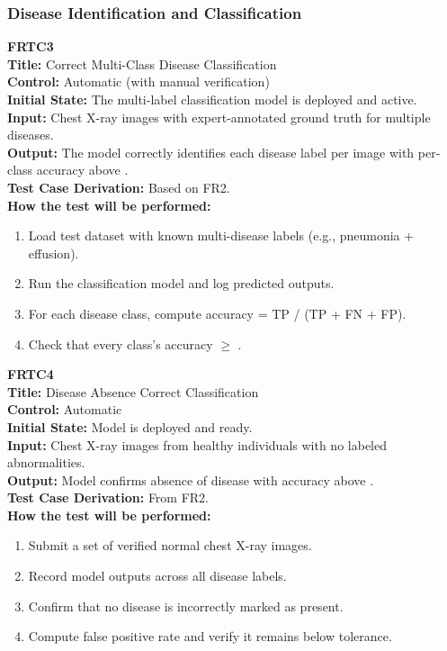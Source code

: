 \documentclass[12pt, titlepage]{article}
\begin{document}
\vspace{1em}

\subsubsection{Disease Identification and Classification}

\textbf{FRTC3}\\
\textbf{Title:} Correct Multi-Class Disease Classification\\
\textbf{Control:} Automatic (with manual verification)\\
\textbf{Initial State:} The multi-label classification model is deployed and active.\\
\textbf{Input:} Chest X-ray images with expert-annotated ground truth for multiple diseases.\\
\textbf{Output:} The model correctly identifies each disease label per image with per-class accuracy above \ACCURACYTHRESHOLD{}.\\
\textbf{Test Case Derivation:} Based on FR2.\\
\textbf{How the test will be performed:}
\begin{enumerate}
  \item Load test dataset with known multi-disease labels (e.g., pneumonia + effusion).
  \item Run the classification model and log predicted outputs.
  \item For each disease class, compute accuracy = TP / (TP + FN + FP).
  \item Check that every class's accuracy \( \geq \) \ACCURACYTHRESHOLD{}.
\end{enumerate}

\vspace{1em}

\textbf{FRTC4}\\
\textbf{Title:} Disease Absence Correct Classification\\
\textbf{Control:} Automatic\\
\textbf{Initial State:} Model is deployed and ready.\\
\textbf{Input:} Chest X-ray images from healthy individuals with no labeled abnormalities.\\
\textbf{Output:} Model confirms absence of disease with accuracy above \ACCURACYTHRESHOLD{}.\\
\textbf{Test Case Derivation:} From FR2.\\
\textbf{How the test will be performed:}
\begin{enumerate}
  \item Submit a set of verified normal chest X-ray images.
  \item Record model outputs across all disease labels.
  \item Confirm that no disease is incorrectly marked as present.
  \item Compute false positive rate and verify it remains below tolerance.
\end{enumerate}
\end{document}
